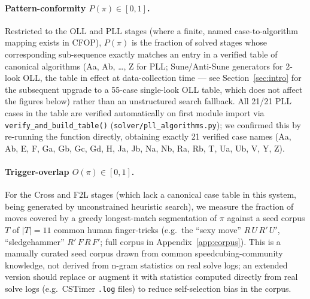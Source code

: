 \documentclass[10pt,conference]{article}
\begin{document}
\paragraph{Pattern-conformity $P(\pi) \in [0,1]$.}
\label{sec:hli-conformity}
Restricted to the OLL and PLL stages (where a finite, named
case-to-algorithm mapping exists in CFOP), $P(\pi)$ is the fraction
of solved stages whose corresponding sub-sequence exactly matches an
entry in a verified table of canonical algorithms (Aa, Ab, \ldots,
Z for PLL; Sune/Anti-Sune generators for 2-look OLL, the table in
effect at data-collection time --- see Section~\ref{sec:intro} for
the subsequent upgrade to a 55-case single-look OLL table, which does
not affect the
figures below) rather than an
unstructured search fallback. All 21/21 PLL cases in the table are
verified automatically on first module import via
\texttt{verify\_and\_build\_table()}
(\texttt{solver/pll\_algorithms.py}); we confirmed this by re-running
the function directly, obtaining exactly 21 verified case names (Aa,
Ab, E, F, Ga, Gb, Gc, Gd, H, Ja, Jb, Na, Nb, Ra, Rb, T, Ua, Ub, V, Y,
Z).

\paragraph{Trigger-overlap $O(\pi) \in [0,1]$.}
\label{sec:hli-trigger}
For the Cross and F2L stages (which lack a canonical case table in
this system, being generated by unconstrained heuristic search), we
measure the fraction of moves covered by a greedy longest-match
segmentation of $\pi$ against a seed corpus $T$ of $|T|=11$ common
human finger-tricks \citep{jperm-fingertricks} (e.g.\ the ``sexy
move'' $R\,U\,R'\,U'$,
``sledgehammer'' $R'\,F\,R\,F'$; full corpus in
Appendix~\ref{app:corpus}). This is a manually curated seed corpus
drawn from common speedcubing-community knowledge, not derived from
n-gram statistics on real solve logs; an extended version should
replace or augment it with statistics computed directly from real
solve logs (e.g.\ CSTimer \texttt{.log} files) to reduce
self-selection bias in the corpus.
\end{document}
